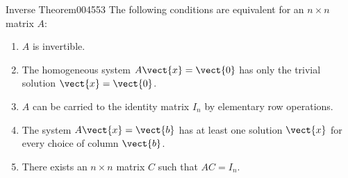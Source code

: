 \begin{theorem}{Inverse Theorem}{004553}
The following conditions are equivalent for an $n \times n$ matrix $A$:

\begin{enumerate}
\item $A$ is invertible.

\item The homogeneous system $A\vect{x} = \vect{0}$ has only the trivial solution $\vect{x} = \vect{0}$.

\item $A$ can be carried to the identity matrix $I_{n}$ by elementary row operations.

\item The system $A\vect{x} = \vect{b}$ has at least one solution $\vect{x}$ for every choice of column $\vect{b}$.

\item There exists an $n \times n$ matrix $C$ such that $AC = I_{n}$.

\end{enumerate}
\end{theorem}

